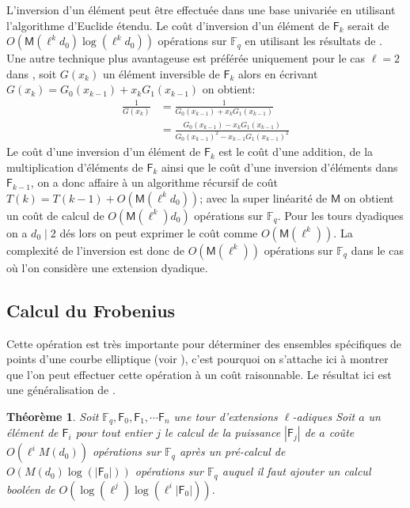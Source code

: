 \documentclass[10pt,a4paper]{book}
\theoremstyle{plain}
\newtheorem{thm}{Théorème}[chapter]
\theoremstyle{definition}
\theoremstyle{definition}
\theoremstyle{definition}
\theoremstyle{definition}
\theoremstyle{remark}
\theoremstyle{remark}
\theoremstyle{definition}
\begin{document}
L'inversion d'un élément peut être effectuée dans une base univariée en utilisant l'algorithme d'Euclide étendu. Le coût d'inversion d'un élément de $\mathsf{F}_k$ serait de $O(\mathsf{M}(\ell^kd_0)\log(\ell^kd_0))$ opérations sur $\mathbb{F}_q$ en utilisant les résultats de \cite[ch.11]{vzGJG03}. Une autre technique plus avantageuse est préférée uniquement pour le cas $\ell=2$ dans \cite{Doliskani-Schost15}, soit $G(x_k)$ un élément inversible de $\mathsf{F}_k$ alors en écrivant $G(x_k)=G_0(x_{k-1})+x_kG_1(x_{k-1})$ on obtient:
\begin{align*}
\frac{1}{G(x_k)} &=\frac{1}{G_0(x_{k-1})+x_kG_1(x_{k-1})} \\
 				&= \frac{G_0(x_{k-1})-x_kG_1(x_{k-1})}{G_0(x_{k-1})^2-x_{k-1}G_1(x_{k-1})^2}
\end{align*}
Le coût d'une inversion d'un élément de $\mathsf{F}_k$ est le coût d'une addition, de la multiplication d'éléments de $\mathsf{F}_k$ ainsi que le coût d'une inversion d'éléments dans $\mathsf{F}_{k-1}$, on a donc affaire à un algorithme récursif de coût  $T(k)=T(k-1)+O(\mathsf{M}(\ell^kd_0))$; avec la super linéarité de $\mathsf{M}$ on obtient un coût de calcul de $O(\mathsf{M}(\ell^k)d_0)$ opérations sur $\mathbb{F}_q$. Pour les tours dyadiques on a $d_0 \mid 2$ dés lors on peut exprimer le coût comme $O(\mathsf{M}(\ell^k))$. La complexité de l'inversion est donc de $O(\mathsf{M}(\ell^k))$ opérations sur $\mathbb{F}_q$ dans le cas où l'on considère une extension dyadique.

\subsection*{Calcul du Frobenius}

Cette opération est très importante pour déterminer des ensembles spécifiques de points d'une courbe elliptique (voir ), c'est pourquoi on s'attache ici à montrer que l'on peut effectuer cette opération à un coût raisonnable. Le résultat ici est une généralisation de \cite{Doliskani-Schost15}.

\begin{thm} \label{thm:frob-ell}
Soit $\mathbb{F}_q, \mathsf{F}_0, \mathsf{F}_1,  \cdots \mathsf{F}_n$ une tour d'extensions $\ell$-adiques
Soit $a$ un élément de $\mathsf{F}_i$ pour tout entier $j$ le calcul de la puissance $|\mathsf{F}_j|$ de $a$ coûte
 $O(\ell^{i}M(d_0))$ opérations sur $\mathbb{F}_q$ après un pré-calcul de $O( M(d_0)\log(|\mathsf{F}_0|))$ opérations sur $\mathbb{F}_q$
auquel il faut ajouter un calcul booléen de $O(\log(\ell^j)\log(\ell^i|\mathsf{F}_0|))$.
\end{thm} 
\end{document}
